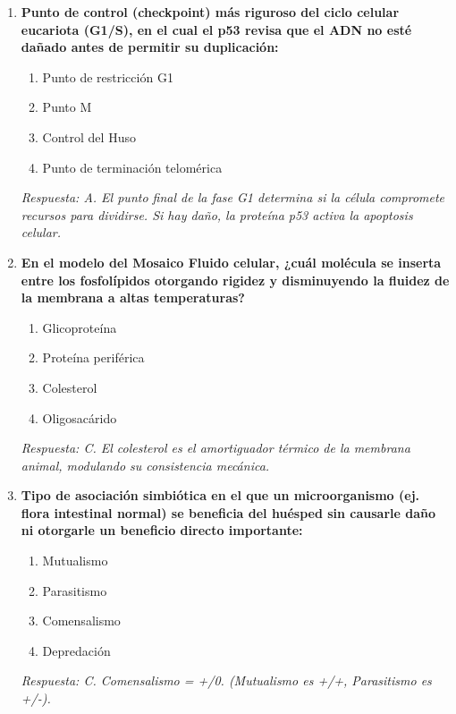 \documentclass[spanish,letterpaper,oneside]{article}
\begin{document}
\begin{enumerate}[label=\textbf{\arabic*.}]
    \item \textbf{Punto de control (checkpoint) más riguroso del ciclo celular eucariota (G1/S), en el cual el p53 revisa que el ADN no esté dañado antes de permitir su duplicación:}
    \begin{enumerate}
        \item[A)] Punto de restricción G1
        \item[B)] Punto M
        \item[C)] Control del Huso
        \item[D)] Punto de terminación telomérica
    \end{enumerate}
    \textit{Respuesta: A. El punto final de la fase G1 determina si la célula compromete recursos para dividirse. Si hay daño, la proteína p53 activa la apoptosis celular.}

    \item \textbf{En el modelo del Mosaico Fluido celular, ¿cuál molécula se inserta entre los fosfolípidos otorgando rigidez y disminuyendo la fluidez de la membrana a altas temperaturas?}
    \begin{enumerate}
        \item[A)] Glicoproteína
        \item[B)] Proteína periférica
        \item[C)] Colesterol
        \item[D)] Oligosacárido
    \end{enumerate}
    \textit{Respuesta: C. El colesterol es el amortiguador térmico de la membrana animal, modulando su consistencia mecánica.}

    \item \textbf{Tipo de asociación simbiótica en el que un microorganismo (ej. flora intestinal normal) se beneficia del huésped sin causarle daño ni otorgarle un beneficio directo importante:}
    \begin{enumerate}
        \item[A)] Mutualismo
        \item[B)] Parasitismo
        \item[C)] Comensalismo
        \item[D)] Depredación
    \end{enumerate}
    \textit{Respuesta: C. Comensalismo = +/0. (Mutualismo es +/+, Parasitismo es +/-).}


\end{enumerate}
\end{document}
